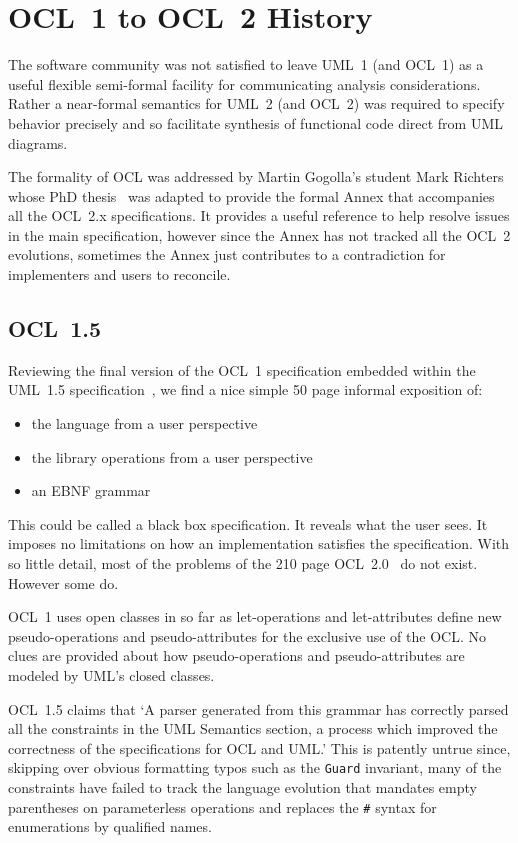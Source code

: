 \documentclass{jot}
\begin{document}
\section{OCL~1 to OCL~2 History}\label{History}

The software community was not satisfied to leave UML~1 (and OCL~1) as a useful flexible semi-formal facility for communicating analysis considerations. Rather a near-formal semantics for UML~2 (and OCL~2) was required to specify behavior precisely and so facilitate synthesis of functional code direct from UML diagrams. 

The formality of OCL was addressed by Martin Gogolla's student Mark Richters whose PhD thesis~\cite{Richters} was adapted to provide the formal Annex that accompanies all the OCL~2.x specifications. It provides a useful reference to help resolve issues in the main specification, however since the Annex has not tracked all the OCL~2 evolutions, sometimes the Annex just contributes to a contradiction for implementers and users to reconcile.

\subsection{OCL~1.5}

Reviewing the final version of the OCL~1 specification embedded within the UML~1.5 specification~\cite{UML-1.5}, we find a nice simple 50 page informal exposition of:
\begin{itemize}
	\item{the language from a user perspective}
	\item{the library operations from a user perspective}
	\item{an EBNF grammar}
\end{itemize}

This could be called a black box specification. It reveals what the user sees. It imposes no limitations on how an implementation satisfies the specification. With so little detail, most of the problems of the 210 page OCL~2.0~\cite{OCL-2.0} do not exist. However some do.

OCL~1 uses open classes in so far as let-operations and let-attributes define new pseudo-operations and pseudo-attributes for the exclusive use of the OCL. No clues are provided about how pseudo-operations and pseudo-attributes are modeled by UML's closed classes.

OCL~1.5 claims that `A parser generated from this grammar has correctly parsed all the constraints in the UML Semantics section, a process which improved the correctness of the specifications for OCL and UML.' This is patently untrue since, skipping over obvious formatting typos such as the \verb$Guard$ invariant, many of the constraints have failed to track the language evolution that mandates empty parentheses on parameterless operations and replaces the \verb$#$ syntax for enumerations by qualified names.
\end{document}
